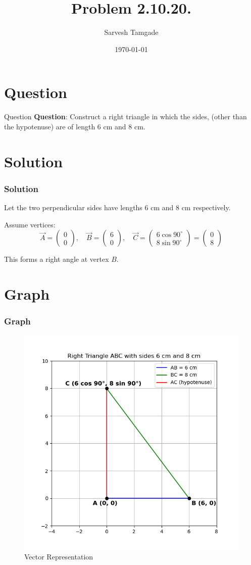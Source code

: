 \documentclass{beamer}
\title{Problem 2.10.20.}
\author{Sarvesh Tamgade}
\date{\today}
\theoremstyle{remark}
\numberwithin{equation}{section}
\begin{document}
\begin{frame}
\titlepage
\end{frame}

\section{Question}
\begin{frame}{Question}
\textbf{Question}:
 Construct a right triangle in which the sides, (other than the hypotenuse) are of length 6 cm and 8 cm.
\end{frame}

\section{Solution}
\begin{frame}[fragile]
    \frametitle{Solution}
Let the two perpendicular sides have lengths 6 cm and 8 cm respectively.

Assume vertices:
\[
\vec{A} = \begin{pmatrix}0 \\ 0 \end{pmatrix},\quad
\vec{B} = \begin{pmatrix}6 \\ 0 \end{pmatrix}, \quad
\vec{C} = \begin{pmatrix}6 \cos 90^\circ \\ 8 \sin 90^\circ \end{pmatrix} = \begin{pmatrix}0 \\ 8 \end{pmatrix}
\]

This forms a right angle at vertex \(B\).



\end{frame}
\section{Graph}
\begin{frame}
    \frametitle{Graph}
    \begin{figure}[htbp]
    \centering
    \includegraphics[width=0.65\linewidth]{FIG/fig1.png}
    \caption{Vector Representation}
    \label{fig:FIG/fig1.png}
\end{figure}
\end{frame}
\end{document}
